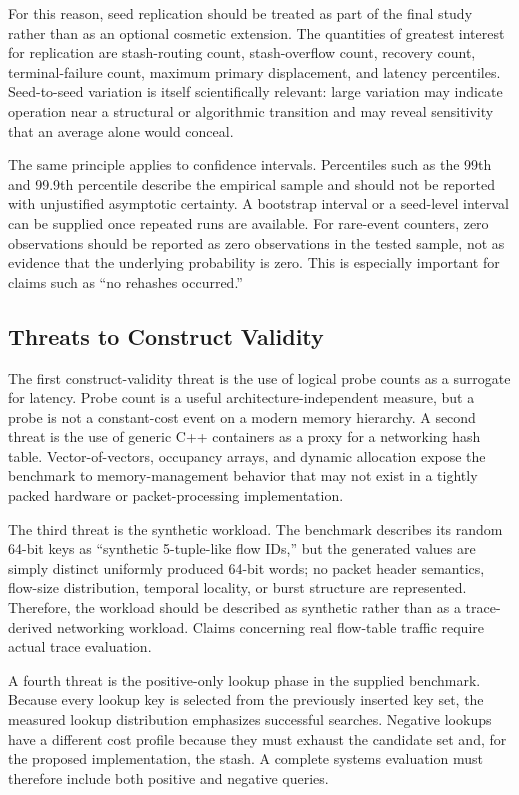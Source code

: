 \documentclass[conference]{IEEEtran}
\begin{document}
For this reason, seed replication should be treated as part of the final study
rather than as an optional cosmetic extension. The quantities of greatest
interest for replication are stash-routing count, stash-overflow count,
recovery count, terminal-failure count, maximum primary displacement, and
latency percentiles. Seed-to-seed variation is itself scientifically relevant:
large variation may indicate operation near a structural or algorithmic
transition and may reveal sensitivity that an average alone would conceal.

The same principle applies to confidence intervals. Percentiles such as the
99th and 99.9th percentile describe the empirical sample and should not be
reported with unjustified asymptotic certainty. A bootstrap interval or a
seed-level interval can be supplied once repeated runs are available. For
rare-event counters, zero observations should be reported as zero observations
in the tested sample, not as evidence that the underlying probability is zero.
This is especially important for claims such as ``no rehashes occurred.''

\subsection{Threats to Construct Validity}
\label{subsec:discussion_construct}

The first construct-validity threat is the use of logical probe counts as a
surrogate for latency. Probe count is a useful architecture-independent
measure, but a probe is not a constant-cost event on a modern memory hierarchy.
A second threat is the use of generic C++ containers as a proxy for a networking
hash table. Vector-of-vectors, occupancy arrays, and dynamic allocation expose
the benchmark to memory-management behavior that may not exist in a tightly
packed hardware or packet-processing implementation.

The third threat is the synthetic workload. The benchmark describes its random
64-bit keys as ``synthetic 5-tuple-like flow IDs,'' but the generated values are
simply distinct uniformly produced 64-bit words; no packet header semantics,
flow-size distribution, temporal locality, or burst structure are represented.
Therefore, the workload should be described as synthetic rather than as a
trace-derived networking workload. Claims concerning real flow-table traffic
require actual trace evaluation.

A fourth threat is the positive-only lookup phase in the supplied benchmark.
Because every lookup key is selected from the previously inserted key set, the
measured lookup distribution emphasizes successful searches. Negative lookups
have a different cost profile because they must exhaust the candidate set and,
for the proposed implementation, the stash. A complete systems evaluation
must therefore include both positive and negative queries.
\end{document}

